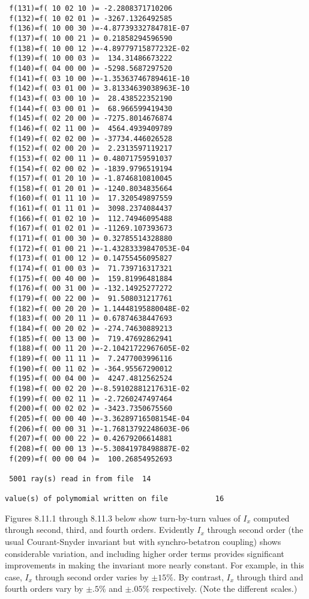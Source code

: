 \begin{footnotesize}
\begin{verbatim}
 f(131)=f( 10 02 10 )= -2.2808371710206
 f(132)=f( 10 02 01 )= -3267.1326492585
 f(136)=f( 10 00 30 )=-4.87739332784781E-07
 f(137)=f( 10 00 21 )= 0.21858294596590
 f(138)=f( 10 00 12 )=-4.89779715877232E-02
 f(139)=f( 10 00 03 )=  134.31486673222
 f(140)=f( 04 00 00 )= -5298.5687297520
 f(141)=f( 03 10 00 )=-1.35363746789461E-10
 f(142)=f( 03 01 00 )= 3.81334639038963E-10
 f(143)=f( 03 00 10 )=  28.438522352190
 f(144)=f( 03 00 01 )=  68.966599419430
 f(145)=f( 02 20 00 )= -7275.8014676874
 f(146)=f( 02 11 00 )=  4564.4939409789
 f(149)=f( 02 02 00 )= -37734.446026528
 f(152)=f( 02 00 20 )=  2.2313597119217
 f(153)=f( 02 00 11 )= 0.48071759591037
 f(154)=f( 02 00 02 )= -1839.9796519194
 f(157)=f( 01 20 10 )= -1.8746810810045
 f(158)=f( 01 20 01 )= -1240.8034835664
 f(160)=f( 01 11 10 )=  17.320549897559
 f(161)=f( 01 11 01 )=  3098.2374084437
 f(166)=f( 01 02 10 )=  112.74946095488
 f(167)=f( 01 02 01 )= -11269.107393673
 f(171)=f( 01 00 30 )= 0.32785514328880
 f(172)=f( 01 00 21 )=-1.43283339847053E-04
 f(173)=f( 01 00 12 )= 0.14755456095827
 f(174)=f( 01 00 03 )=  71.739716317321
 f(175)=f( 00 40 00 )=  159.81996481884
 f(176)=f( 00 31 00 )= -132.14925277272
 f(179)=f( 00 22 00 )=  91.508031217761
 f(182)=f( 00 20 20 )= 1.14448195880048E-02
 f(183)=f( 00 20 11 )= 0.67874638447693
 f(184)=f( 00 20 02 )= -274.74630889213
 f(185)=f( 00 13 00 )=  719.47692862941
 f(188)=f( 00 11 20 )=-2.10421722967605E-02
 f(189)=f( 00 11 11 )=  7.2477003996116
 f(190)=f( 00 11 02 )= -364.95567290012
 f(195)=f( 00 04 00 )=  4247.4812562524
 f(198)=f( 00 02 20 )=-8.59102881217631E-02
 f(199)=f( 00 02 11 )= -2.7260247497464
 f(200)=f( 00 02 02 )= -3423.7350675560
 f(205)=f( 00 00 40 )=-3.36289716508154E-04
 f(206)=f( 00 00 31 )=-1.76813792248603E-06
 f(207)=f( 00 00 22 )= 0.42679206614881
 f(208)=f( 00 00 13 )=-5.30841978498887E-02
 f(209)=f( 00 00 04 )=  100.26854952693

 5001 ray(s) read in from file  14

value(s) of polymomial written on file           16
\end{verbatim}
\end{footnotesize}

Figures 8.11.1 through 8.11.3 below show turn-by-turn values of $I_x$ computed through second, third, and fourth orders.  Evidently $I_x$ through second order (the usual Courant-Snyder invariant but with synchro-betatron coupling) shows considerable variation, and including higher order terms provides significant improvements in making the invariant more nearly constant.  For example, in this case, $I_x$ through second order varies by $\pm 15\%$.  By contrast, $I_x$ through third and fourth orders vary by $\pm .5\%$ and $\pm .05\%$ respectively.  (Note the different scales.)

